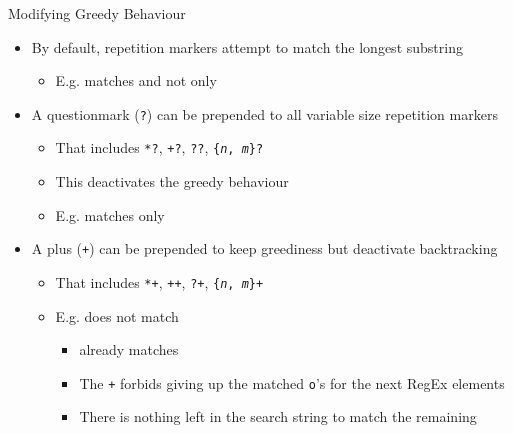 \begin{frame}{Modifying Greedy Behaviour}
%
\begin{itemize}
\item By default, repetition markers attempt to match the longest substring
	\begin{itemize}
	\item E.\;g.  matches  and not only 
	\end{itemize}
\pause
\item A questionmark (\texttt{?}) can be prepended to all variable size repetition markers 
	\begin{itemize}
	\item That includes \texttt{*?}, \texttt{+?}, \texttt{??}, \texttt{\{\textit{n}, \textit{m}\}?}
	\item This deactivates the greedy behaviour
	\item E.\;g.  matches only 
	\end{itemize}
\pause
\item A plus (\texttt{+}) can be prepended to keep greediness but deactivate backtracking
	\begin{itemize}
	\item That includes \texttt{*+}, \texttt{++}, \texttt{?+}, \texttt{\{\textit{n}, \textit{m}\}+}
	\item E.\;g.  does not match 
		\begin{itemize}
		\item {} already matches 
		\item The \texttt{\color{purple}+} forbids giving up the matched \texttt{\color{blue}o}'s for the next RegEx elements
		\item There is nothing left in the search string to match the remaining 
		\end{itemize}
	\end{itemize}
\end{itemize}
%
\end{frame}


